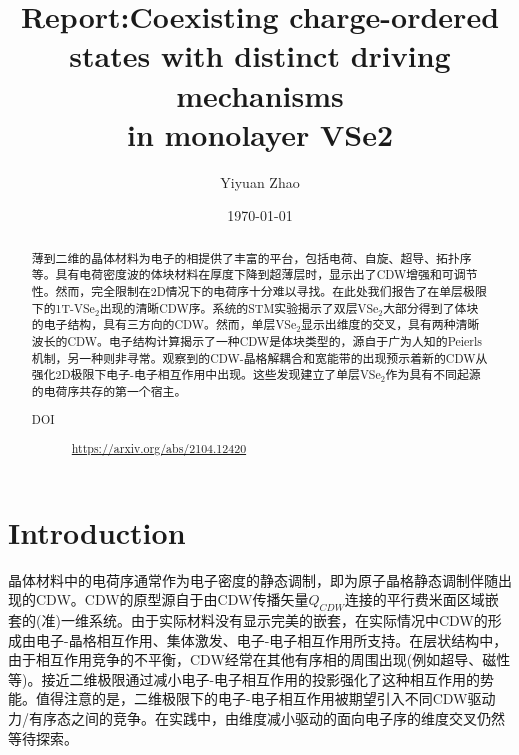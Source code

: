 \documentclass[reprint, aps, prb, showkeys]{revtex4-2}
\begin{document}
\title{Report:Coexisting charge-ordered states with distinct driving mechanisms \\
in monolayer VSe2}

\author{Yiyuan Zhao}
\date{\today}

\begin{abstract}
薄到二维的晶体材料为电子的相提供了丰富的平台，包括电荷、自旋、超导、拓扑序等。具有电荷密度波的体块材料在厚度下降到超薄层时，显示出了CDW增强和可调节性。然而，完全限制在2D情况下的电荷序十分难以寻找。在此处我们报告了在单层极限下的1T-VSe$_2$出现的清晰CDW序。系统的STM实验揭示了双层VSe$_2$大部分得到了体块的电子结构，具有三方向的CDW。然而，单层VSe$_2$显示出维度的交叉，具有两种清晰波长的CDW。电子结构计算揭示了一种CDW是体块类型的，源自于广为人知的Peierls机制，另一种则非寻常。观察到的CDW-晶格解耦合和宽能带的出现预示着新的CDW从强化2D极限下电子-电子相互作用中出现。这些发现建立了单层VSe$_2$作为具有不同起源的电荷序共存的第一个宿主。
\begin{description}
    \item[DOI] \url{https://arxiv.org/abs/2104.12420}
\end{description}
\end{abstract}


\maketitle

\section{Introduction}
晶体材料中的电荷序通常作为电子密度的静态调制，即为原子晶格静态调制伴随出现的CDW。CDW的原型源自于由CDW传播矢量$Q_{CDW}$连接的平行费米面区域嵌套的(准)一维系统。由于实际材料没有显示完美的嵌套，在实际情况中CDW的形成由电子-晶格相互作用、集体激发、电子-电子相互作用所支持。在层状结构中，由于相互作用竞争的不平衡，CDW经常在其他有序相的周围出现(例如超导、磁性等)。接近二维极限通过减小电子-电子相互作用的投影强化了这种相互作用的势能。值得注意的是，二维极限下的电子-电子相互作用被期望引入不同CDW驱动力/有序态之间的竞争。在实践中，由维度减小驱动的面向电子序的维度交叉仍然等待探索。
\end{document}
